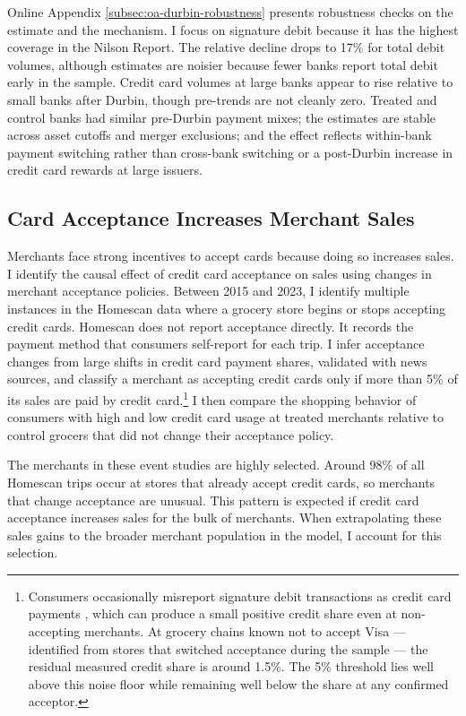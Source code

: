 \documentclass[main.tex]{subfiles}
\begin{document}
Online Appendix \ref{subsec:oa-durbin-robustness} presents robustness checks on the estimate and the mechanism.
I focus on signature debit because it has the highest coverage in the Nilson Report.
The relative decline drops to 17\% for total debit volumes, although estimates are noisier because fewer banks report total debit early in the sample.
Credit card volumes at large banks appear to rise relative to small banks after Durbin, though pre-trends are not cleanly zero.
Treated and control banks had similar pre-Durbin payment mixes; the estimates are stable across asset cutoffs and merger exclusions; and the effect reflects within-bank payment switching rather than cross-bank switching or a post-Durbin increase in credit card rewards at large issuers.

\subsection{Card Acceptance Increases Merchant Sales}
\label{subsec:merchant-card-gains}

Merchants face strong incentives to accept cards because doing so increases sales.
I identify the causal effect of credit card acceptance on sales using changes in merchant acceptance policies.
Between 2015 and 2023, I identify multiple instances in the Homescan data where a grocery store begins or stops accepting credit cards.
Homescan does not report acceptance directly. It records the payment method that consumers self-report for each trip.
I infer acceptance changes from large shifts in credit card payment shares, validated with news sources, and classify a merchant as accepting credit cards only if more than 5\% of its sales are paid by credit card.\footnote{Consumers occasionally misreport signature debit transactions as credit card payments \parencite{Rysman.etal2025}, which can produce a small positive credit share even at non-accepting merchants.
At grocery chains known not to accept Visa --- identified from stores that switched acceptance during the sample --- the residual measured credit share is around 1.5\%.
The 5\% threshold lies well above this noise floor while remaining well below the share at any confirmed acceptor.}
I then compare the shopping behavior of consumers with high and low credit card usage at treated merchants relative to control grocers that did not change their acceptance policy.

The merchants in these event studies are highly selected.
Around 98\% of all Homescan trips occur at stores that already accept credit cards, so merchants that change acceptance are unusual.
This pattern is expected if credit card acceptance increases sales for the bulk of merchants.
When extrapolating these sales gains to the broader merchant population in the model, I account for this selection.
\end{document}
